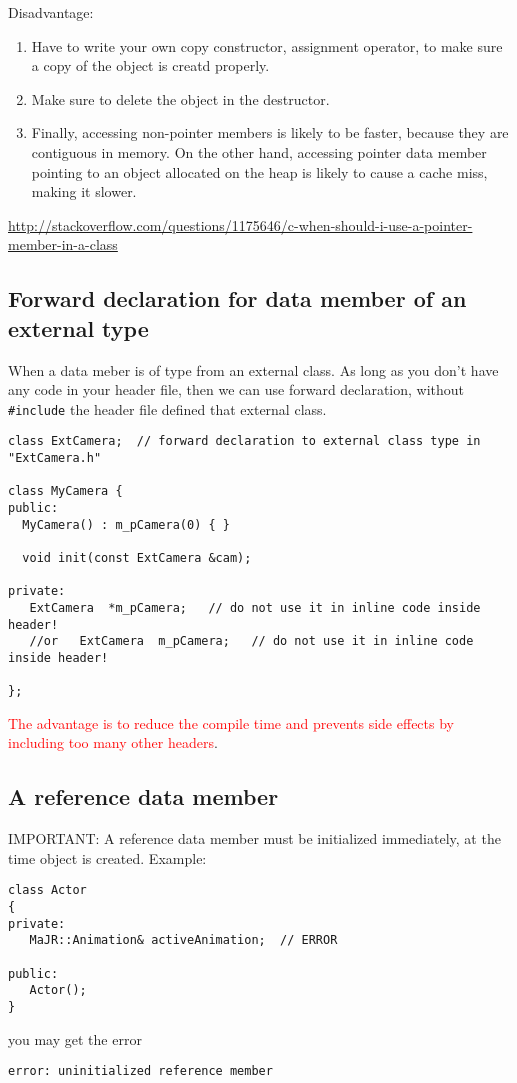 Disadvantage:
\begin{enumerate}
  \item Have to write your own copy constructor, assignment operator, to make
  sure a copy of the object is creatd properly.
  
  \item Make sure to delete the object in the destructor.
  
  \item  Finally, accessing non-pointer members is likely to be faster, because
  they are contiguous in memory. On the other hand, accessing pointer data
  member pointing to an object allocated on the heap is likely to cause a cache
  miss, making it slower.
  
\end{enumerate}
\url{http://stackoverflow.com/questions/1175646/c-when-should-i-use-a-pointer-member-in-a-class}

\subsection{Forward declaration for data member of an external type}


When a data meber is of type from an external class.
As long as you don't have any code in your header file, then we can use forward
declaration, without \verb!#include! the header file defined that
external class.
  
\begin{verbatim}
class ExtCamera;  // forward declaration to external class type in "ExtCamera.h"

class MyCamera {
public: 
  MyCamera() : m_pCamera(0) { }

  void init(const ExtCamera &cam);

private:
   ExtCamera  *m_pCamera;   // do not use it in inline code inside header!
   //or   ExtCamera  m_pCamera;   // do not use it in inline code inside header!
   
};
\end{verbatim}

\textcolor{red}{The advantage is to reduce the compile time and prevents side
effects by including too many other headers}.

\subsection{A reference data member}
\label{sec:reference-data-member}

IMPORTANT: A reference data member must be initialized immediately, at the time
object is created.  Example: 
\begin{verbatim}
class Actor
{
private:
   MaJR::Animation& activeAnimation;  // ERROR
	
public:
   Actor();
}
\end{verbatim}
you may get the error
\begin{verbatim}
error: uninitialized reference member
\end{verbatim}

